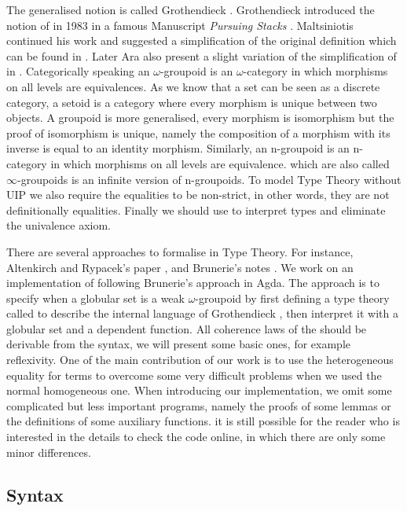 The generalised notion is called Grothendieck \og{}. Grothendieck introduced the notion of \og{} in 1983 in a famous Manuscript \emph{Pursuing Stacks} \cite{gro:ps}. Maltsiniotis continued his work and suggested a simplification of the original definition which can be found in \cite{mal:gwog}. Later Ara also present a slight variation of the simplification of \wog{} in \cite{ara:wog}. Categorically
speaking an $\omega$-groupoid is an $\omega$-category in which morphisms on all levels are equivalences. As we know that a set can be seen as a discrete
category, a setoid is a category where every morphism is unique between
two objects. A groupoid is more generalised, every morphism is
isomorphism but the proof of isomorphism is unique, namely the composition of a morphism with its inverse is equal to an identity morphism. Similarly, an
n-groupoid is an n-category in which morphisms on all levels are
equivalence. \og{} which are also called $\infty$-groupoids is an
infinite version of n-groupoids. To model Type Theory without UIP we
also require the equalities to be non-strict, in other words, they are
not definitionally equalities. Finally we should use \wog{} to interpret types and eliminate the univalence axiom.

There are several approaches to formalise \wog{} in Type Theory. For
instance, Altenkirch and Rypacek's paper \cite{txa:csl}, and Brunerie's notes
\cite{gb:wog}. We work on an implementation of \wog{} following Brunerie's approach in Agda. The approach is to specify when a globular set is a weak $\omega$-groupoid by first defining a type theory called \tig{} to describe the internal language
of Grothendieck \wog{}, then interpret it with a globular set and a
dependent function. All coherence laws of the \wog{} should be
derivable from the syntax, we will present some basic ones, for
example reflexivity. One of the main contribution of our work is to
use the heterogeneous equality for terms to overcome some very
difficult problems when we used the normal homogeneous one. When
introducing our implementation, we omit some complicated but less important programs, namely the proofs of some lemmas or the definitions of some auxiliary functions. it is still possible for the reader who is interested in the details to check the code online, in which there are only some minor differences.


\subsection{Syntax}

